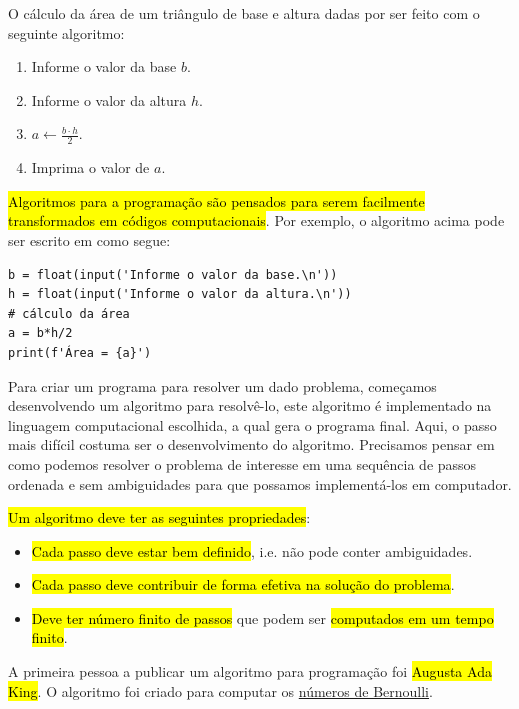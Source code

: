 \begin{ex}\label{cap_lingua_sec_algoprog:ex:areaTriang}
O cálculo da área de um triângulo de base e altura dadas por ser feito com o seguinte algoritmo:
\begin{enumerate}
\item Informe o valor da base $b$.
\item Informe o valor da altura $h$.
\item $\displaystyle a \leftarrow \frac{b\cdot h}{2}$.
\item Imprima o valor de $a$.
\end{enumerate}

\hl{Algoritmos para a programação são pensados para serem facilmente transformados em códigos computacionais}. Por exemplo, o algoritmo acima pode ser escrito em {\python} como segue:

\begin{lstlisting}
b = float(input('Informe o valor da base.\n'))
h = float(input('Informe o valor da altura.\n'))
# cálculo da área
a = b*h/2
print(f'Área = {a}')
\end{lstlisting}

\end{ex}

Para criar um programa para resolver um dado problema, começamos desenvolvendo um algoritmo para resolvê-lo, este algoritmo é implementado na linguagem computacional escolhida, a qual gera o programa final. Aqui, o passo mais difícil costuma ser o desenvolvimento do algoritmo. Precisamos pensar em como podemos resolver o problema de interesse em uma sequência de passos ordenada e sem ambiguidades para que possamos implementá-los em computador.

\hl{Um algoritmo deve ter as seguintes propriedades}:
\begin{itemize}
\item \hl{Cada passo deve estar bem definido}, i.e. não pode conter ambiguidades.
\item \hl{Cada passo deve contribuir de forma efetiva na solução do problema}.
\item \hl{Deve ter número finito de passos} que podem ser \hl{computados em um tempo finito}.
\end{itemize}

\begin{obs}
  A primeira pessoa a publicar um algoritmo para programação foi \hl{Augusta Ada King}{\lovelace}. O algoritmo foi criado para computar os \href{https://pt.wikipedia.org/wiki/N\%C3\%BAmeros\_de\_Bernoulli}{números de Bernoulli}{\bernoulli}.
\end{obs}



